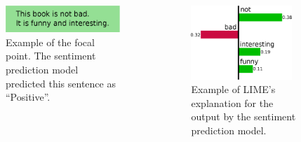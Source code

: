 \documentclass[aspectratio=169]{slide-en}
\begin{document}
\begin{frame}{}
  \begin{columns}[]
    \begin{column}{0.35\textwidth}
      \vspace{4.2em}
      \begin{figure}
        \includegraphics[width=\textwidth]{example-instance}
        \vspace{0.8em}
        \caption{%
          Example of the focal point.
          The sentiment prediction model predicted this sentence as ``Positive''.
        }
      \end{figure}
    \end{column}
    \begin{column}{0.4\textwidth}
      \begin{figure}
        \includegraphics[width=0.9\textwidth]{example-lime}
        \caption{%
          Example of LIME's explanation for the output
          by the sentiment prediction model.
        }
      \end{figure}
    \end{column}
  \end{columns}
\end{frame}
\end{document}
